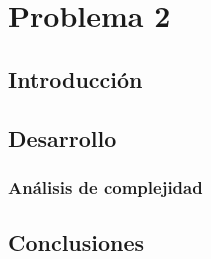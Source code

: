 \section{Problema 2}

\subsection{Introducci\'on}

\subsection{Desarrollo}

\subsubsection{An\'alisis de complejidad}

\subsection{Conclusiones}